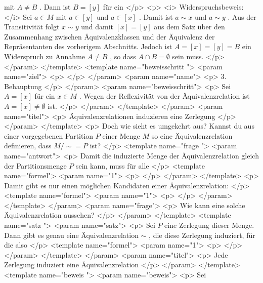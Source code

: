        mit
       $A\ne B$
       . Dann ist
       $B=[y]$
       für ein
      </p>
      <p>
       <i>
        Widerspruchsbeweis:
       </i>
       Sei
       $a\in M$
       mit
       $a\in [y]$
       und
       $a\in [x]$
       . Damit ist
       $a\sim x$
       und
       $a\sim y$
       . Aus der Transitivität folgt
       $x\sim y$
       und damit
       $[x]=[y]$
       aus dem Satz über den Zusammenhang zwischen Äquivalenzklassen und der Äquivalenz der Repräsentanten des vorherigem Abschnitts. Jedoch ist
       $A=[x]=[y]=B$
       ein Widerspruch zu Annahme
       $A\ne B$
       , so dass
       $A\cap B=\emptyset$
       sein muss.
      </p>
     </param>
    </template>
    <template name="beweisschritt
 ">
     <param name="ziel">
      <p>
      </p>
     </param>
     <param name="name">
      <p>
       3. Behauptung
      </p>
     </param>
     <param name="beweisschritt">
      <p>
       Sei
       $A=[x]$
       für ein
       $x\in M$
       . Wegen der Reflexivität von der Äquivalenzrelation ist
       $A=[x]\ne \emptyset$
       ist.
      </p>
     </param>
    </template>
   </param>
   <param name="titel">
    <p>
     Äquivalenzrelationen induzieren eine Zerlegung
    </p>
   </param>
  </template>
  <p>
   Doch wie sieht es umgekehrt aus? Kannst du aus einer vorgegebenen Partition
   $P$
   einer Menge
   $M$
   so eine Äquivalenzrelation definieren, dass
   ${M/{\sim}}=P$
   ist?
  </p>
  <template name="frage
 ">
   <param name="antwort">
    <p>
     Damit die induzierte Menge der Äquivalenzrelation gleich der Partitionsmenge
     $P$
     sein kann, muss für alle
    </p>
    <template name="formel">
     <param name="1">
      <p>
      </p>
     </param>
    </template>
    <p>
     Damit gibt es nur einen möglichen Kandidaten einer Äquivalenzrelation:
    </p>
    <template name="formel">
     <param name="1">
      <p>
      </p>
     </param>
    </template>
   </param>
   <param name="frage">
    <p>
     Wie kann eine solche Äquivalenzrelation aussehen?
    </p>
   </param>
  </template>
  <template name="satz
 ">
   <param name="satz">
    <p>
     Sei
     $P$
     eine Zerlegung dieser Menge. Dann gibt es genau eine Äquivalenzrelation
     $\sim$
     , die diese Zerlegung induziert, für die also
    </p>
    <template name="formel">
     <param name="1">
      <p>
      </p>
     </param>
    </template>
   </param>
   <param name="titel">
    <p>
     Jede Zerlegung induziert eine Äquivalenzrelation
    </p>
   </param>
  </template>
  <template name="beweis
 ">
   <param name="beweis">
    <p>
     Sei
